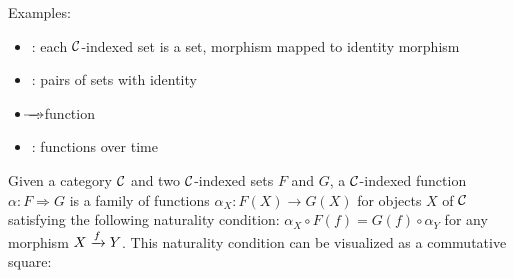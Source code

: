Examples: 
\begin{itemize}
  \item {}: each $\mathcal C$-indexed set is a set, morphism mapped to identity morphism
  \item {}\!\!\!\!\!\!\! : pairs of sets with identity
  \item \(\usebox0\!\!\!\!\!\!\!\!\!\longrightarrow\!\!\!\!\!\!\!\!\!\usebox0\): function
  \item 
{}:
functions over time
\end{itemize}


\begin{definition}
  \sloppy
  Given a category $\mathcal C$ and two $\mathcal C$-indexed sets $F$ and $G$, 
  a $\mathcal C$-indexed function $\alpha : F \Rightarrow G$ 
  is a family of functions $\alpha_X : F(X) \to G(X)$ for objects $X$ 
  of $\mathcal C$ satisfying the following naturality condition:
  $\alpha_X \circ F(f) = G(f) \circ \alpha_Y$
  for any morphism $X \xrightarrow{f} Y$.
  This naturality condition can be visualized as a commutative square:
  \begin{center}
  \end{center}
\end{definition}

